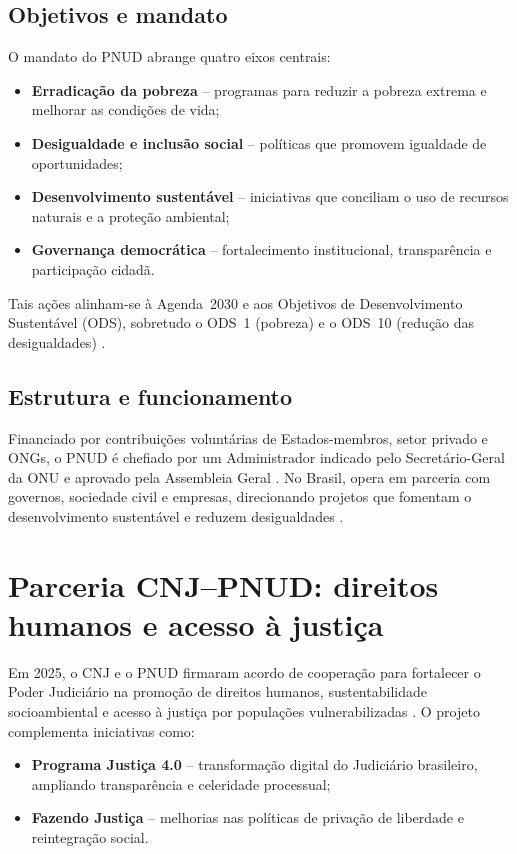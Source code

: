 \begin{description}
\subsection{Objetivos e mandato}
O mandato do PNUD abrange quatro eixos centrais:
\begin{itemize}
  \item \textbf{Erradicação da pobreza} – programas para reduzir a pobreza
  extrema e melhorar as condições de vida;
  \item \textbf{Desigualdade e inclusão social} – políticas que promovem
  igualdade de oportunidades;
  \item \textbf{Desenvolvimento sustentável} – iniciativas que conciliam o uso
  de recursos naturais e a proteção ambiental;
  \item \textbf{Governança democrática} – fortalecimento institucional,
  transparência e participação cidadã.
\end{itemize}
Tais ações alinham-se à Agenda~2030 e aos Objetivos de Desenvolvimento
Sustentável (ODS), sobretudo o ODS~1 (pobreza) e o ODS~10 (redução das
desigualdades) \cite{wikipedia2025pnud}.

\subsection{Estrutura e funcionamento}
Financiado por contribuições voluntárias de Estados-membros, setor privado e
ONGs, o PNUD é chefiado por um Administrador indicado pelo Secretário-Geral da
ONU e aprovado pela Assembleia Geral \cite{undp2025onu}. No Brasil, opera em
parceria com governos, sociedade civil e empresas, direcionando projetos que
fomentam o desenvolvimento sustentável e reduzem desigualdades
\cite{undp2025sobre}.

\section{Parceria CNJ–PNUD: direitos humanos e acesso à justiça}
\label{sec:cnj-pnud}

Em 2025, o CNJ e o PNUD firmaram acordo de
cooperação para fortalecer o Poder Judiciário na promoção de direitos humanos,
sustentabilidade socioambiental e acesso à justiça por populações
vulnerabilizadas \cite{undp2025pnudcnj}. O projeto complementa iniciativas como:
\begin{itemize}
  \item \textbf{Programa Justiça 4.0} – transformação digital do Judiciário
        brasileiro, ampliando transparência e celeridade processual;
  \item \textbf{Fazendo Justiça} – melhorias nas políticas de privação de
        liberdade e reintegração social.
\end{itemize}


\end{description}
